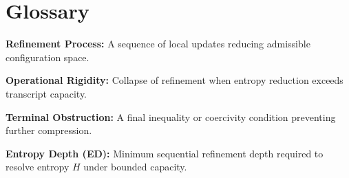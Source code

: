 \section*{Glossary}

\textbf{Refinement Process:} A sequence of local updates reducing admissible configuration space.

\textbf{Operational Rigidity:} Collapse of refinement when entropy reduction exceeds transcript capacity.

\textbf{Terminal Obstruction:} A final inequality or coercivity condition preventing further compression.

\textbf{Entropy Depth (ED):} Minimum sequential refinement depth required to resolve entropy $H$ under bounded capacity.
